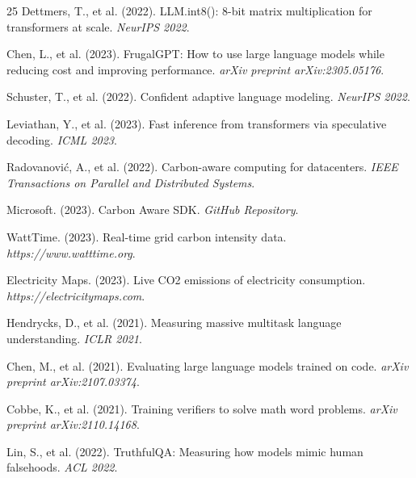 \documentclass[conference]{IEEEtran}
\begin{document}
\begin{thebibliography}{25}
Dettmers, T., et al. (2022). LLM.int8(): 8-bit matrix multiplication for transformers at scale. \textit{NeurIPS 2022}.

Chen, L., et al. (2023). FrugalGPT: How to use large language models while reducing cost and improving performance. \textit{arXiv preprint arXiv:2305.05176}.

Schuster, T., et al. (2022). Confident adaptive language modeling. \textit{NeurIPS 2022}.

Leviathan, Y., et al. (2023). Fast inference from transformers via speculative decoding. \textit{ICML 2023}.

Radovanović, A., et al. (2022). Carbon-aware computing for datacenters. \textit{IEEE Transactions on Parallel and Distributed Systems}.

Microsoft. (2023). Carbon Aware SDK. \textit{GitHub Repository}.

WattTime. (2023). Real-time grid carbon intensity data. \textit{https://www.watttime.org}.

Electricity Maps. (2023). Live CO2 emissions of electricity consumption. \textit{https://electricitymaps.com}.

Hendrycks, D., et al. (2021). Measuring massive multitask language understanding. \textit{ICLR 2021}.

Chen, M., et al. (2021). Evaluating large language models trained on code. \textit{arXiv preprint arXiv:2107.03374}.

Cobbe, K., et al. (2021). Training verifiers to solve math word problems. \textit{arXiv preprint arXiv:2110.14168}.

Lin, S., et al. (2022). TruthfulQA: Measuring how models mimic human falsehoods. \textit{ACL 2022}.

\end{thebibliography}
\end{document}
